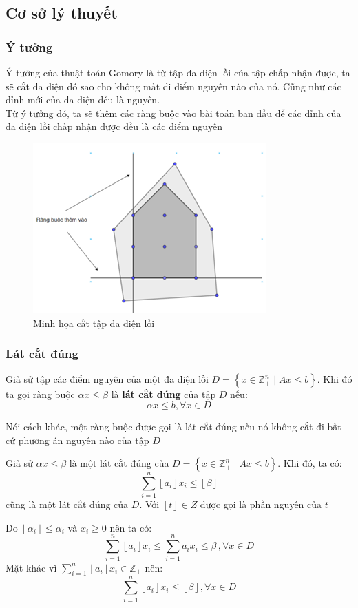 \documentclass[12pt,a4paper]{article}\author{Nguyễn Nho Dũng}
\newcommand{\kniem}[1]{{\sffamily\bfseries #1}}
\newcommand{\taphop}[1]{\left\{#1\right\}}
\newcommand{\tonglanluot}[2]{\sum_{#1}^{#2}}
\newcommand{\phannguyen}[1]{\left\lfloor #1 \right\rfloor}
\begin{document}
\subsection{Cơ sở lý thuyết}
\subsubsection{Ý tưởng}
Ý tưởng của thuật toán Gomory là từ tập đa diện lồi của tập chấp nhận được, ta sẽ cắt đa diện đó sao cho không mất đi điểm nguyên nào của nó. Cũng như các đỉnh mới của đa diện đều là nguyên. \\
Từ ý tưởng đó, ta sẽ thêm các ràng buộc vào bài toán ban đầu để các đỉnh của đa diện lồi chấp nhận được đều là các điểm nguyên
\begin{figure} [H]
    \centering
    \includegraphics{Anh/mota_latcat}
    \caption{Minh họa cắt tập đa diện lồi}
    \label{fig:1}
\end{figure}
\subsubsection{Lát cắt đúng}
\begin{dnghia}
	Giả sử tập các điểm nguyên của một đa diện lồi $D = \taphop{ x\in \mathbb{Z}^n_+ \mid Ax \le b}$. Khi đó ta gọi ràng buộc $\alpha x \le \beta$ là \kniem{lát cắt đúng} của tập $D$ nếu: $$\alpha x \le b, \forall x\in D$$
\end{dnghia}
Nói cách khác, một ràng buộc được gọi là lát cắt đúng nếu nó không cắt đi bất cứ phương án nguyên nào của tập $D$

\begin{dly}
	Giả sử $\alpha x \le \beta$ là một lát cắt đúng của $D = \taphop{ x\in \mathbb{Z}^n_+ \mid Ax \le b}$. Khi đó, ta có:
	\begin{equation}
		\tonglanluot{i = 1}{n}\phannguyen{a_i} x_i \le \phannguyen{\beta}
	\end{equation}
	cũng là một lát cắt đúng của $D$. Với $\phannguyen{t} \in Z$ được gọi là phần nguyên của $t$
\end{dly}
\begin{cm}
	Do $\phannguyen{\alpha_i} \le \alpha_i$ và $x_i \ge 0$ nên ta có:
	$$\tonglanluot{i=1}{n} \phannguyen{a_i} x_i \le \tonglanluot{i=1}{n} a_i x_i \le \beta\,, \forall x\in D$$  
	Mặt khác vì $\tonglanluot{i=1}{n} \phannguyen{a_i} x_i \in \mathbb{Z}_+$ nên:
	$$\tonglanluot{i=1}{n} \phannguyen{a_i} x_i \le \phannguyen{\beta}, \forall x\in D$$
\end{cm}
\end{document}
